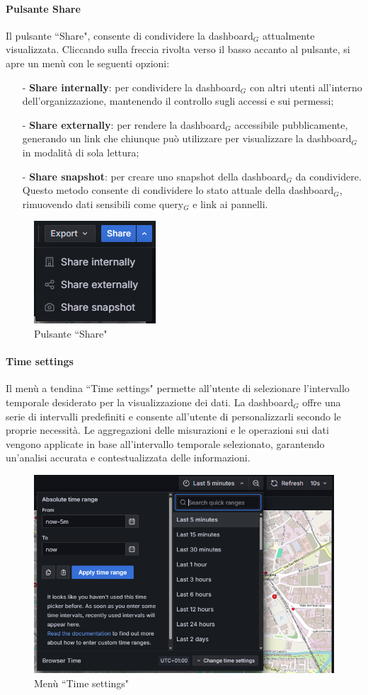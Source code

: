 \documentclass[10pt]{article}
\begin{document}
\begin{justify}
    \paragraph{Pulsante Share}
    Il pulsante ``Share", consente di condividere la dashboard$_G$ attualmente visualizzata. Cliccando sulla freccia rivolta verso il basso accanto al pulsante, si apre un menù con le seguenti opzioni:
    \begin{itemize}
        \item[-] \textbf{Share internally}: per condividere la dashboard$_G$ con altri utenti all'interno dell'organizzazione, mantenendo il controllo sugli accessi e sui permessi;
        \item[-] \textbf{Share externally}: per rendere la dashboard$_G$ accessibile pubblicamente, generando un link che chiunque può utilizzare per visualizzare la dashboard$_G$ in modalità di sola lettura;
        \item[-] \textbf{Share snapshot}: per creare uno snapshot della dashboard$_G$ da condividere. Questo metodo consente di condividere lo stato attuale della dashboard$_G$, rimuovendo dati sensibili come query$_G$ e link ai pannelli.
    \end{itemize}
    \begin{figure}[H]
    \centering
    \includegraphics[width=0.25\linewidth]{share.png}
    \caption{Pulsante ``Share"}
    \end{figure}

    \paragraph{Time settings}
    Il menù a tendina ``Time settings" permette all'utente di selezionare l'intervallo temporale desiderato per la visualizzazione dei dati. La dashboard$_G$ offre una serie di intervalli predefiniti e consente all'utente di personalizzarli secondo le proprie necessità. Le aggregazioni delle misurazioni e le operazioni sui dati vengono applicate in base all'intervallo temporale selezionato, garantendo un'analisi accurata e contestualizzata delle informazioni.
    \begin{figure}[H]
    \centering
    \includegraphics[width=0.7\linewidth]{time.png}
    \caption{Menù ``Time settings"}
    \end{figure}


\end{justify}
\end{document}
